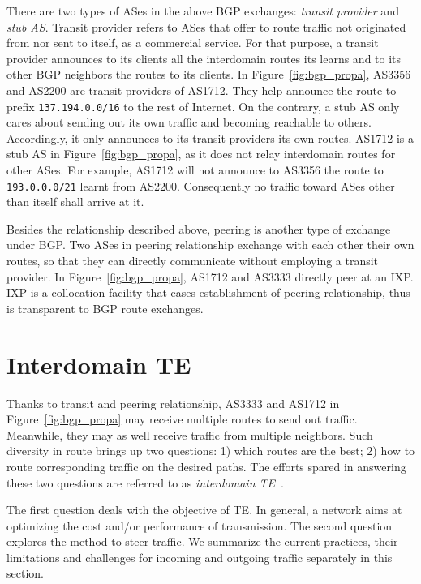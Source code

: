 There are two types of ASes in the above BGP exchanges: \textit{transit provider} and \textit{stub AS}.
Transit provider refers to ASes that offer to route traffic not originated from nor sent to itself, as a commercial service.
For that purpose, a transit provider announces to its clients all the interdomain routes its learns and to its other BGP neighbors the routes to its clients.
In Figure~\ref{fig:bgp_propa}, AS3356 and AS2200 are transit providers of AS1712. They help announce the route to prefix \texttt{137.194.0.0/16}
to the rest of Internet.
On the contrary, a stub AS only cares about sending out its own traffic and becoming reachable to others.
Accordingly, it only announces to its transit providers its own routes. 
AS1712 is a stub AS in Figure~\ref{fig:bgp_propa}, as it does not relay interdomain routes for other ASes. For example, AS1712 will not announce to AS3356 the route to \texttt{193.0.0.0/21} learnt from AS2200. Consequently no traffic toward ASes other than itself shall arrive at it.

Besides the relationship described above, peering is another type of exchange under BGP. Two ASes in peering relationship exchange with each other their own routes, so that they can directly communicate without employing a transit provider.
In Figure~\ref{fig:bgp_propa}, AS1712 and AS3333 directly peer at an \ac{IXP}.
\ac{IXP} is a collocation facility that eases establishment of peering relationship, thus is transparent to BGP route exchanges.

\section{Interdomain TE}
Thanks to transit and peering relationship, AS3333 and AS1712 in Figure~\ref{fig:bgp_propa} may receive multiple routes to send out traffic.
Meanwhile, they may as well receive traffic from multiple neighbors.
Such diversity in route brings up two questions: 1) which routes are the best; 2) how to route corresponding traffic on the desired paths.
The efforts spared in answering these two questions are referred to as \textit{interdomain \ac{TE}}~\cite{Quoitin2004a,Quoitin2003,Feamster2003}.

The first question deals with the objective of \ac{TE}. In general, a network aims at optimizing the cost and/or performance of transmission.
The second question explores the method to steer traffic.
We summarize the current practices, their limitations and challenges for incoming and outgoing traffic separately in this section.

